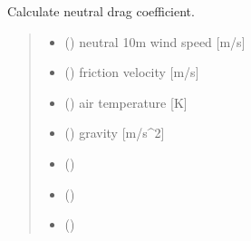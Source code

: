\documentclass[letterpaper,10pt,english]{sphinxmanual}
\begin{document}

\begin{fulllineitems}
\label{\detokenize{users_guide:AirSeaFluxCode.flux_subs.drag_coef.cdn_calc}}
\pysigstartsignatures
{}
\pysigstopsignatures
\sphinxAtStartPar
Calculate neutral drag coefficient.
\begin{quote}\begin{description}
\begin{itemize}
\item {} 
\sphinxAtStartPar
{} () \textendash{} neutral 10m wind speed {[}m/s{]}

\item {} 
\sphinxAtStartPar
{} () \textendash{} friction velocity      {[}m/s{]}

\item {} 
\sphinxAtStartPar
{} () \textendash{} air temperature        {[}K{]}

\item {} 
\sphinxAtStartPar
{} () \textendash{} gravity               {[}m/s\textasciicircum{}2{]}

\item {} 
\sphinxAtStartPar
{} () \textendash{} 

\end{itemize}

\sphinxAtStartPar
\begin{itemize}
\item {} 
\sphinxAtStartPar
{} ()

\item {} 
\sphinxAtStartPar
{} ()

\end{itemize}


\end{description}\end{quote}

\end{fulllineitems}
\end{document}
